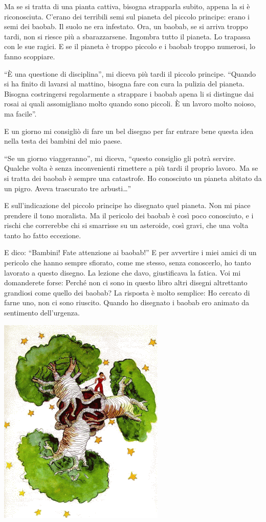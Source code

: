 \documentclass[11pt]{scrbook}
\begin{document}
Ma se si tratta di una pianta cattiva, bisogna strapparla subito, appena la si è riconosciuta. C'erano dei terribili semi sul pianeta del piccolo principe: erano i semi dei baobab. Il suolo ne era infestato. Ora, un baobab, se si arriva troppo tardi, non si riesce più a sbarazzarsene. Ingombra tutto il pianeta. Lo trapassa con le sue ragici. E se il pianeta è troppo piccolo e i baobab troppo numerosi, lo fanno scoppiare.

``È una questione di disciplina'', mi diceva più tardi il piccolo principe. ``Quando si ha finito di lavarsi al mattino, bisogna fare con cura la pulizia del pianeta. Bisogna costringersi regolarmente a strappare i baobab apena li si distingue dai rosai ai quali assomigliano molto quando sono piccoli. È un lavoro molto noioso, ma facile''.

E un giorno mi consigliò di fare un bel disegno per far entrare bene questa idea nella testa dei bambini del mio paese.

``Se un giorno viaggeranno'', mi diceva, ``questo consiglio gli potrà servire. Qualche volta è senza inconvenienti rimettere a più tardi il proprio lavoro. Ma se si tratta dei baobab è sempre una catastrofe. Ho conosciuto un pianeta abitato da un pigro. Aveva trascurato tre arbusti\ldots{}''

E sull'indicazione del piccolo principe ho disegnato quel pianeta. Non mi piace prendere il tono moralista. Ma il pericolo dei baobab è così poco conosciuto, e i rischi che correrebbe chi si smarrisse su un asteroide, così gravi, che una volta tanto ho fatto eccezione.

E dico: ``Bambini! Fate attenzione ai baobab!'' E per avvertire i miei amici di un pericolo che hanno sempre sfiorato, come me stesso, senza conoscerlo, ho tanto lavorato a questo disegno. La lezione che davo, giustificava la fatica. Voi mi domanderete forse: Perché non ci sono in questo libro altri disegni altrettanto grandiosi come quello dei baobab? La risposta è molto semplice: Ho cercato di farne uno, non ci sono riuscito. Quando ho disegnato i baobab ero animato da sentimento dell'urgenza.

\begin{center}
\includegraphics{img/baobaby}
\end{center}
\end{document}
